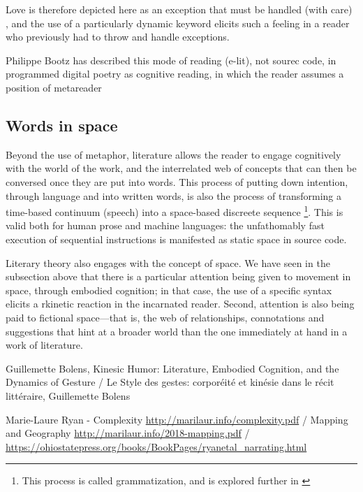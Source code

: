 Love is therefore depicted here as an exception that must be handled (with care) , and the use of a particularly dynamic keyword elicits such a feeling in a reader who previously had to throw and handle exceptions.

Philippe Bootz has described this mode of reading (e-lit), not sourec code, in programmed digital poetry as cognitive reading, in which the reader assumes a position of metareader

\subsection{Words in space}
\label{subsec:spatial-literature}

Beyond the use of metaphor, literature allows the reader to engage cognitively with the world of the work, and the interrelated web of concepts that can then be conversed once they are put into words. This process of putting down intention, through language and into written words, is also the process of transforming a time-based continuum (speech) into a space-based discreete sequence \footnote{This process is called grammatization, and is explored further in \citep{bouchardon_valeur_2014}}. This is valid both for human prose and machine languages: the unfathomably fast execution of sequential instructions is manifested as static space in source code.

Literary theory  also engages with the concept of space. We have seen in the subsection above that there is a particular attention being given to movement in space, through embodied cognition; in that case, the use of a specific syntax elicits a rkinetic reaction in the incarnated reader. Second, attention is also being paid to fictional space—that is, the web of relationships, connotations and suggestions that hint at a broader world than the one immediately at hand in a work of literature.

Guillemette Bolens, Kinesic Humor: Literature, Embodied Cognition, and the Dynamics of Gesture / Le Style des gestes: corporéité et kinésie dans le récit littéraire, Guillemette Bolens


Marie-Laure Ryan - Complexity \url{http://marilaur.info/complexity.pdf} / Mapping and Geography \url{http://marilaur.info/2018-mapping.pdf} / \url{https://ohiostatepress.org/books/BookPages/ryanetal_narrating.html}

